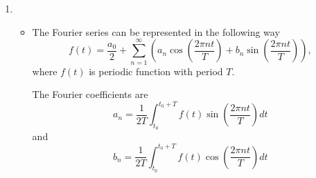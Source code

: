 \documentclass[letterpaper]{article}
\begin{document}
\begin{enumerate}
\item 
\begin{itemize}
\item
The Fourier series can be represented in the following way
\begin{equation*}
f(t)=\frac{a_0}{2}+\sum_{n=1}^{\infty} \left( a_n \cos(\frac{2\pi n t}{T})+b_n \sin(\frac{2 \pi n t}{T})\right),
\end{equation*}
where $f(t)$ is periodic function with period $T$. 

The Fourier coefficients are 
\begin{equation*}
a_n=\frac{1}{2 T}\int_{t_0}^{t_0+T}f(t) \sin(\frac{2 \pi n t}{T})dt
\end{equation*}
and
\begin{equation*}
b_n=\frac{1}{2 T}\int_{t_0}^{t_0+T}f(t) \cos(\frac{2 \pi n t}{T})dt
\end{equation*}


\end{itemize}
\end{enumerate}
\end{document}
